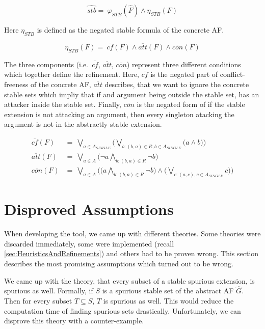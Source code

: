 $$ \hat{stb}=\  \varphi_{\!S\!T\!B}(\hat{F}) \land \eta_{S\!T\!B}(F) $$

\vspace{0.04cm}
Here $\eta_{S\!T\!B}$ is defined as the negated stable formula of the concrete AF.
\vspace{0.01cm}


$$
\eta_{S\!T\!B}(F) =\ \overline{cf}(F) \land \overline{att}(F) \land \overline{con}(F)
$$


The three components (i.e.\ $\overline{cf}$, $\overline{att}$, $\overline{con}$) represent three different conditions which together define the refinement. Here, $\overline{cf}$ is the negated part of conflict-freeness of the concrete AF, $\overline{att}$ describes, that we want to ignore the concrete stable sets which impliy that if and argument being outside the stable set, has an attacker inside the stable set. Finally, $\overline{con}$ is the negated form of if the stable extension is not attacking an argument, then every singleton atacking the argument is not in the abstractly stable extension.

\begin{align*}
    \overline{cf}(F)&=\ \bigvee_{a \in A_{\!S\!I\!N\!G\!L\!E}} \big( \bigvee_{b:(b,a)\in R, b \in A_{\!S\!I\!N\!G\!L\!E}} \big( a \land b \big) \big)\\[0.2cm]
    \overline{att}(F)&=\ \bigvee_{a \in A} \big( \lnot a \bigwedge_{b:(b,a)\in R} \lnot b \big)\\[0.2cm]
    \overline{con}(F)&=\ \bigvee_{a \in A} \big( \big( a \bigwedge_{b:(b,a)\in R} \lnot b) \land \big(\bigvee_{c:(a,c), c\in A_{\!S\!I\!N\!G\!L\!E}} c\big) \big)
\end{align*}


\section{Disproved Assumptions}
\label{sec:ImplementationsDisprovedAssumptions}

When developing the tool, we came up with different theories. Some theories were discarded immediately, some were implemented (recall \cref{sec:HeuristicsAndRefinements}) and others had to be proven wrong. This section describes the most promising assumptions which turned out to be wrong.

We came up with the theory, that every subset of a stable spurious extension, is spurious as well. Formally, if $S$ is a spurious stable set of the abstract AF $\hat{G}$. Then for every subset $T \subseteq S$, $T$ is spurious as well. This would reduce the computation time of finding spurious sets drastically. Unfortunately, we can disprove this theory with a counter-example.

